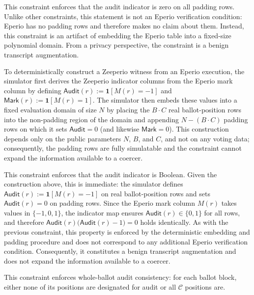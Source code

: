 
This constraint enforces that the audit indicator is zero on all padding rows. Unlike other constraints, this statement is not an Eperio verification condition: Eperio has no padding rows and therefore makes no claim about them. Instead, this constraint is an artifact of embedding the Eperio table into a fixed-size polynomial domain. From a privacy perspective, the constraint is a benign transcript augmentation. 

To deterministically construct a Zeeperio witness from an Eperio execution, the simulator first derives the Zeeperio indicator columns from the Eperio mark column by defining $\mathsf{Audit}(r):=\mathbf{1}[M(r)=-1]$ and $\mathsf{Mark}(r):=\mathbf{1}[M(r)=1]$. The simulator then embeds these values into a fixed evaluation domain of size $N$ by placing the $B\cdot C$ real ballot-position rows into the non-padding region of the domain and appending $N-(B\cdot C)$ padding rows on which it sets $\mathsf{Audit}=0$ (and likewise $\mathsf{Mark}=0$). This construction depends only on the public parameters $N$, $B$, and $C$, and not on any voting data; consequently, the padding rows are fully simulatable and the constraint cannot expand the information available to a coercer.


This constraint enforces that the audit indicator is Boolean. Given the construction above, this is immediate: the simulator defines $\mathsf{Audit}(r):=\mathbf{1}[M(r)=-1]$ on real ballot-position rows and sets $\mathsf{Audit}(r)=0$ on padding rows. Since the Eperio mark column $M(r)$ takes values in $\{-1,0,1\}$, the indicator map ensures $\mathsf{Audit}(r)\in\{0,1\}$ for all rows, and therefore $\mathsf{Audit}(r)\bigl(\mathsf{Audit}(r)-1\bigr)=0$ holds identically. As with the previous constraint, this property is enforced by the deterministic embedding and padding procedure and does not correspond to any additional Eperio verification condition. Consequently, it constitutes a benign transcript augmentation and does not expand the information available to a coercer.


This constraint enforces whole-ballot audit consistency: for each ballot block, either none of its positions are designated for audit or all $\mathcal{C}$ positions are. 

